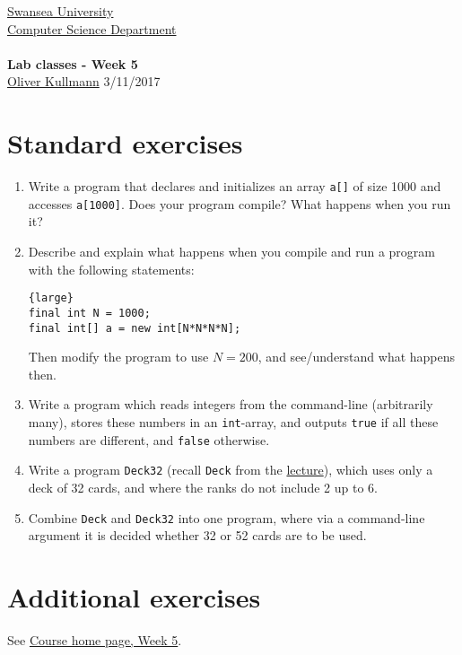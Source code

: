 \documentclass[11pt]{article}
\newcommand{\Java}{\lstset{language=Java,keywordstyle=\bfseries,breaklines,breakindent=30pt}}
\begin{document}
\begin{center}
  \href{http://www.swan.ac.uk/}{Swansea University}\\
  \href{http://www.swan.ac.uk/compsci/}{Computer Science Department}\\[1ex]
  \href{\chp}{\module}\\[1ex]
  \textbf{Lab classes - Week 5}\\
  \href{http://cs.swan.ac.uk/~csoliver}{Oliver Kullmann} 3/11/2017
\end{center}

\section{Standard exercises}
\label{sec:stdex}

\Java

\begin{enumerate}
\item Write a program that declares and initializes an array \texttt{a[]} of size 1000 and accesses \texttt{a[1000]}. Does your program compile? What happens when you run it?
\item Describe and explain what happens when you compile and run a program with the following statements:
  \begin{lstlisting}{large}
final int N = 1000;
final int[] a = new int[N*N*N*N];
  \end{lstlisting}
  Then modify the program to use $N = 200$, and see/understand what happens then.
\item Write a program which reads integers from the command-line (arbitrarily many), stores these numbers in an \texttt{int}-array, and outputs \texttt{true} if all these numbers are different, and \texttt{false} otherwise.
\item Write a program \texttt{Deck32} (recall \texttt{Deck} from the \href{http://cs.swan.ac.uk/~csoliver/ProgrammingJava201415_MgQxuCUrrS/index.html#LecturesWeek05}{lecture}), which uses only a deck of 32 cards, and where the ranks do not include 2 up to 6.
\item Combine \texttt{Deck} and \texttt{Deck32} into one program, where via a command-line argument it is decided whether 32 or 52 cards are to be used.
\end{enumerate}


\section{Additional exercises}
\label{sec:addex}

See \href{\chp#ExercisesWeek05}{Course home page, Week 5}.
\end{document}
